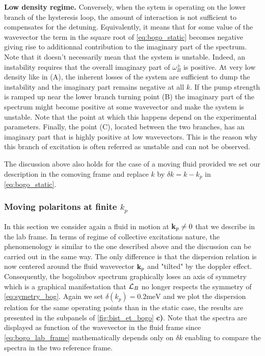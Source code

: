 \bigskip

\textbf{Low density regime.} Conversely, when the sytem is operating on the lower branch of the hysteresis loop, the amount of interaction is not sufficient to 
compensates for the detuning. Equivalently, it means that for some value of the wavevector the term in the square root of \autoref{eq:bogo_static} becomes negative
giving rise to additionnal contribution to the imaginary part of the spectrum. Note that it doesn't necessarily mean that the system is unstable. Indeed, an instability 
requires that the overall imaginary part of $\omega^{\pm}_B$ is positive. At very low density like in (A), the inherent losses of the system 
are sufficient to dump the instability and the imaginary part remains negative at all $k$. If the pump strength is ramped up near the lower branch turning point (B) 
the imaginary part of the spectrum might become positive at some wavevector and make the system is unstable. Note that the point at which this happens depend on the experimental
parameters. Finally, the point (C), located between the two branches, has an imaginary part that is highly positive at low wavevectors. This is the reason why this branch of excitation
is often referred as unstable and can not be observed. 


\bigskip 

The discussion above also holds for the case of a moving fluid provided we set our description in the comoving frame and replace $k$ by $\delta k=k-k_p$ in \autoref{eq:bogo_static}.

\subsubsection{Moving polaritons at finite $k_p$}
In this section we consider again a fluid in motion at $\mathbf{k}_p\neq0$ that we describe in the lab frame. In terms of regime of collective excitations nature, the phenomenology is similar to the one
described above and the discussion can be carried out in the same way. The only difference is that the dispersion relation is now centered around the fluid wavevector $\mathbf{k}_p$ and "tilted" by the doppler effect. Consequently, the bogoliubov spectrum graphically 
loses an axis of symmetry which is a graphical manifestation that $\mathcal{L}_B$ no longer respects the symmetry of \autoref{eq:symetry_bog}.
Again we set $\delta(k_p)=0.2 \mathrm{meV}$ and we plot the dispersion relation for the same operating points than in the static case, the results are presented in the subpanels of \autoref{fig:bist_et_bogo} \textbf{c)}. Note that the spectra are displayed as function 
of the wavevector in the fluid frame since \autoref{eq:bogo_lab_frame} mathematically depends only on $\delta k$ enabling to compare the spectra in the two reference frame.

